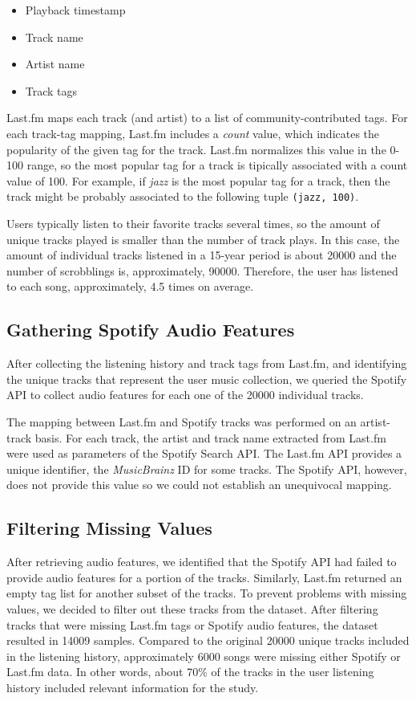 \documentclass[sn-mathphys]{sn-jnl}%
\theoremstyle{thmstyleone}%
\theoremstyle{thmstyletwo}%
\theoremstyle{thmstylethree}%
\begin{document}
\begin{itemize}
\item Playback timestamp
\item Track name
\item Artist name
\item Track tags
\end{itemize}

Last.fm maps each track (and artist) to a list of community-contributed tags.
For each track-tag mapping, Last.fm includes
a \emph{count} value, which indicates the popularity of the given tag for the track.
Last.fm normalizes this value in the 0-100 range, so the most popular tag for a track is tipically associated with a
count value of 100.
For example, if \emph{jazz} is the most popular tag for a track,
then the track might be probably associated to the following tuple \verb|(jazz, 100)|.

Users typically listen to their favorite tracks several times,
so the amount of unique tracks played is smaller
than the number of track plays. In this case, the amount of
individual tracks listened in a 15-year period is about \num{20000} and the number of scrobblings is, approximately, \num{90000}.
Therefore, the user has listened to each song, approximately, \num{4.5} times on average.


\subsection{Gathering Spotify Audio Features}

After collecting the listening history and track tags from Last.fm, and identifying the unique
tracks that represent the user music collection, we queried the Spotify API to
collect audio features for each one of the \num{20000} individual tracks.


The mapping between Last.fm and Spotify tracks was performed on an artist-track basis.
For each track, the artist and track name extracted from Last.fm were used as parameters of the Spotify Search API.
The Last.fm API provides a unique identifier, the \emph{MusicBrainz} ID for some tracks.
The Spotify API, however, does not provide this value so we could not establish an unequivocal mapping.

\subsection{Filtering Missing Values}

After retrieving audio features, we identified that the Spotify API had failed to provide audio features for a portion of the tracks.
Similarly, Last.fm returned an empty tag list for another subset of the tracks.
To prevent problems with missing values, we decided to filter out these tracks from the dataset.
After filtering tracks that were missing Last.fm tags or Spotify audio features,
the dataset resulted in \num{14009} samples.
Compared to the original \num{20000} unique tracks included in the listening history, approximately \num{6000} songs were missing either Spotify or Last.fm data.
In other words, about 70\% of the tracks in the user listening history included relevant information for the study.
\end{document}
